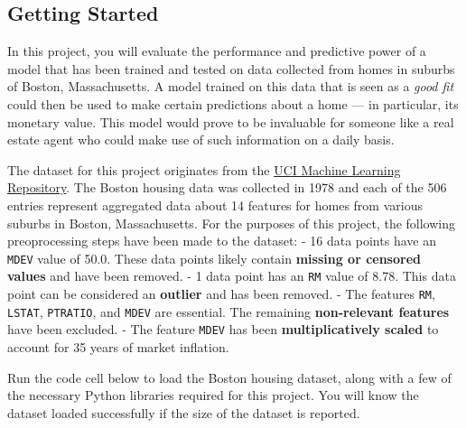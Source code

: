 \documentclass{article}
\begin{document}
    \subsection{Getting Started}\label{getting-started}

In this project, you will evaluate the performance and predictive power
of a model that has been trained and tested on data collected from homes
in suburbs of Boston, Massachusetts. A model trained on this data that
is seen as a \emph{good fit} could then be used to make certain
predictions about a home --- in particular, its monetary value. This
model would prove to be invaluable for someone like a real estate agent
who could make use of such information on a daily basis.

The dataset for this project originates from the
\href{https://archive.ics.uci.edu/ml/datasets/Housing}{UCI Machine
Learning Repository}. The Boston housing data was collected in 1978 and
each of the 506 entries represent aggregated data about 14 features for
homes from various suburbs in Boston, Massachusetts. For the purposes of
this project, the following preoprocessing steps have been made to the
dataset: - 16 data points have an
\texttt{\textquotesingle{}MDEV\textquotesingle{}} value of 50.0. These
data points likely contain \textbf{missing or censored values} and have
been removed. - 1 data point has an
\texttt{\textquotesingle{}RM\textquotesingle{}} value of 8.78. This data
point can be considered an \textbf{outlier} and has been removed. - The
features \texttt{\textquotesingle{}RM\textquotesingle{}},
\texttt{\textquotesingle{}LSTAT\textquotesingle{}},
\texttt{\textquotesingle{}PTRATIO\textquotesingle{}}, and
\texttt{\textquotesingle{}MDEV\textquotesingle{}} are essential. The
remaining \textbf{non-relevant features} have been excluded. - The
feature \texttt{\textquotesingle{}MDEV\textquotesingle{}} has been
\textbf{multiplicatively scaled} to account for 35 years of market
inflation.

Run the code cell below to load the Boston housing dataset, along with a
few of the necessary Python libraries required for this project. You
will know the dataset loaded successfully if the size of the dataset is
reported.
\end{document}
